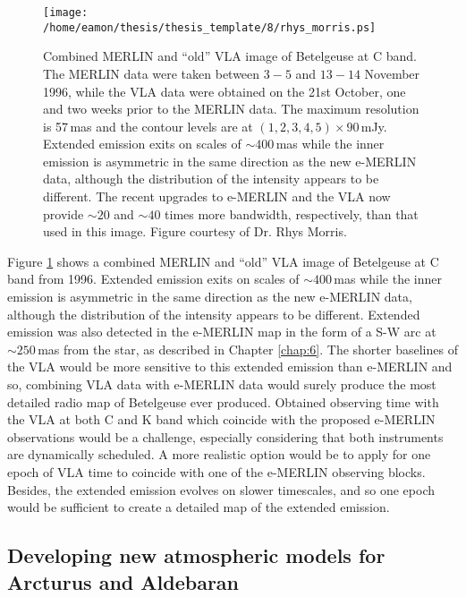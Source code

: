 \begin{figure}[!ht]
\centering 
        \texttt{[image: /home/eamon/thesis/thesis\_template/8/rhys\_morris.ps]}
\caption[MERLIN $+$ ``old'' VLA image of Betelgeuse]{Combined MERLIN and ``old'' VLA image of Betelgeuse at C band. The MERLIN data were taken between $3-5$ and $13-14$ November 1996, while the VLA data were obtained on the 21st October, one and two weeks prior to the MERLIN data. The maximum resolution is 57\,mas and the contour levels are at $(1,2,3,4,5)\times 90\,$mJy. Extended emission exits on scales of $\sim 400$\,mas while the inner emission is asymmetric in the same direction as the new e-MERLIN data, although the distribution of the intensity appears to be different. The recent upgrades to e-MERLIN and the VLA now provide $\sim 20$ and $\sim 40$ times more bandwidth, respectively, than that used in this image. Figure courtesy of Dr. Rhys Morris.} 
\label{fig:8.3}
\end{figure}

Figure \ref{fig:8.3} shows a combined MERLIN and ``old'' VLA image of Betelgeuse at C band from 1996. Extended emission exits on scales of $\sim 400$\,mas while the inner emission is asymmetric in the same direction as the new e-MERLIN data, although the distribution of the intensity appears to be different. Extended emission was also detected in the e-MERLIN map in the form of a S-W arc at $\sim 250$\,mas from the star, as described in Chapter \ref{chap:6}. The shorter baselines of the VLA would be more sensitive to this extended emission than e-MERLIN and so, combining VLA data with e-MERLIN data would surely produce the most detailed radio map of Betelgeuse ever produced. Obtained observing time with the VLA at both C and K band which coincide with the proposed e-MERLIN observations would be a challenge, especially considering that both instruments are dynamically scheduled. A more realistic option would be to apply for one epoch of VLA time to coincide with one of the e-MERLIN observing blocks. Besides, the extended emission evolves on slower timescales, and so one epoch would be sufficient to create a detailed map of the extended emission.

\subsection{Developing new atmospheric models for Arcturus and Aldebaran}\label{sec:8.2.3}

